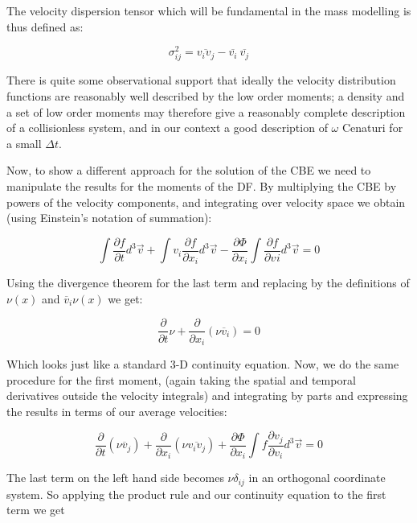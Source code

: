 The velocity dispersion tensor which will be fundamental in the mass modelling is thus defined as:

\begin{equation}
\sigma_{ij}^{2}=\overline{v_{i}v_{j}}-\overline{v_{i}}\:\overline{v_{j}}
\end{equation}

There is quite some observational support that ideally the velocity distribution functions are reasonably well described by the low order moments; a density and a set of low order moments may therefore give a reasonably complete description of a collisionless system, and in our context a good description of $\omega$ Cenaturi for a small $\Delta t$. 

Now, to show a different approach for the solution of the CBE we need to manipulate the results for the moments of the DF. By multiplying the CBE by powers of the velocity components, and integrating over velocity space we obtain (using Einstein's notation of summation):

\begin{equation}
\int \frac{\partial f}{\partial t}d^{3}\vec{v}+ \int v_{i}\frac{\partial f}{\partial x_{i}} d^{3}\vec{v}- \frac{\partial\Phi}{\partial x_{i}}\int \frac{\partial f}{\partial v_{}i} d^{3}\vec{v}= 0
\end{equation}

Using the divergence theorem for the last term and replacing by the definitions of $\nu(x)$ and $\overline{v}_{i}\nu(x)$ we get:

\begin{equation}
\frac{\partial}{\partial t}\nu+\frac{\partial}{\partial x_{i}}(\nu \overline{v}_{i})=0
\end{equation}

Which looks just like a standard 3-D continuity equation. Now, we do the same procedure for the first moment, (again taking the spatial and temporal derivatives outside the velocity integrals) and integrating by parts and expressing the results in terms of our average velocities:

\begin{equation}
\frac{\partial}{\partial t}(\nu \overline{v}_{j})+\frac{\partial}{\partial x_{i}}(\nu \overline{v_{i}v_{j}})+\frac{\partial \Phi}{\partial x_{i}}\int f\frac{\partial v_{j}}{\partial v_{i}}d^{3}\vec{v}=0
\end{equation} 

The last term on the left hand side becomes $\nu \delta_{ij}$ in an orthogonal coordinate system. So applying the product rule and our continuity equation to the first term we get

